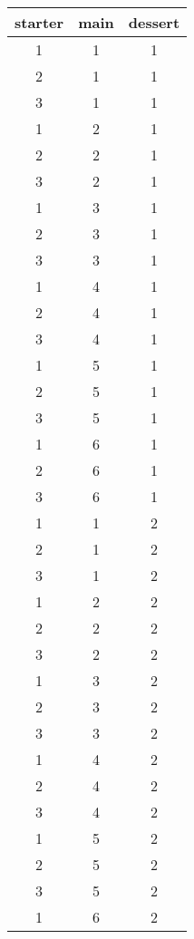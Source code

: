 \documentclass{article}
\begin{document}





\begin{table}[!hb]
\centering
\begin{tabular}{ccc}
\toprule
starter & main & dessert\\
\midrule
1 & 1 & 1\\
2 & 1 & 1\\
3 & 1 & 1\\
1 & 2 & 1\\
2 & 2 & 1\\
3 & 2 & 1\\
1 & 3 & 1\\
2 & 3 & 1\\
3 & 3 & 1\\
1 & 4 & 1\\
2 & 4 & 1\\
3 & 4 & 1\\
1 & 5 & 1\\
2 & 5 & 1\\
3 & 5 & 1\\
1 & 6 & 1\\
2 & 6 & 1\\
3 & 6 & 1\\
1 & 1 & 2\\
2 & 1 & 2\\
3 & 1 & 2\\
1 & 2 & 2\\
2 & 2 & 2\\
3 & 2 & 2\\
1 & 3 & 2\\
2 & 3 & 2\\
3 & 3 & 2\\
1 & 4 & 2\\
2 & 4 & 2\\
3 & 4 & 2\\
1 & 5 & 2\\
2 & 5 & 2\\
3 & 5 & 2\\
1 & 6 & 2\\

\end{tabular}
\end{table}
\end{document}

